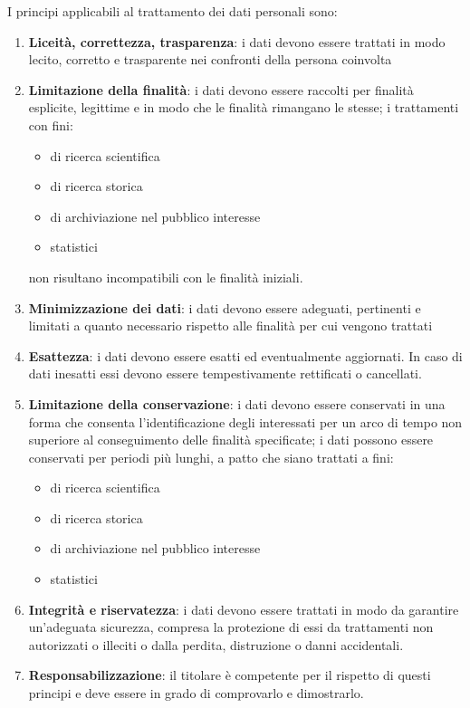 I principi applicabili al trattamento dei dati personali sono:
\begin{enumerate}
    \item \textbf{Liceità, correttezza, trasparenza}: i dati devono essere
        trattati in modo lecito, corretto e trasparente nei confronti della
        persona coinvolta
    \item \textbf{Limitazione della finalità}: i dati devono essere raccolti
        per finalità esplicite, legittime e in modo che le finalità rimangano
        le stesse; i trattamenti con fini:
    \begin{itemize}
        \item di ricerca scientifica
        \item di ricerca storica
        \item di archiviazione nel pubblico interesse
        \item statistici
    \end{itemize}
    non risultano incompatibili con le finalità iniziali.

    \item \textbf{Minimizzazione dei dati}: i dati devono essere adeguati,
        pertinenti e limitati a quanto necessario rispetto alle finalità per
        cui vengono trattati

    \item \textbf{Esattezza}: i dati devono essere esatti ed eventualmente aggiornati.
    In caso di dati inesatti essi devono essere tempestivamente rettificati o cancellati.

    \item \textbf{Limitazione della conservazione}: i dati devono essere
        conservati in una forma che consenta l'identificazione degli
        interessati per un arco di tempo non superiore al conseguimento delle
        finalità specificate; i dati possono essere conservati per periodi più
        lunghi, a patto che siano trattati a fini:
    \begin{itemize}
        \item di ricerca scientifica
        \item di ricerca storica
        \item di archiviazione nel pubblico interesse
        \item statistici
    \end{itemize}

    \item \textbf{Integrità e riservatezza}: i dati devono essere trattati in
        modo da garantire un'adeguata sicurezza, compresa la protezione di essi
        da trattamenti non autorizzati o illeciti o dalla perdita, distruzione
        o danni accidentali.

    \item \textbf{Responsabilizzazione}: il titolare è competente per il
        rispetto di questi principi e deve essere in grado di comprovarlo e
        dimostrarlo.
\end{enumerate}

